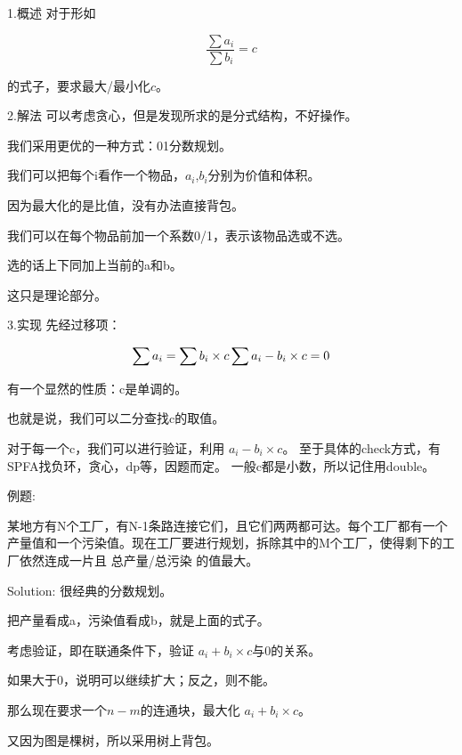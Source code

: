 1.概述
对于形如

$$
\frac{\sum a_i}{\sum b_i}=c
$$

的式子，要求最大/最小化$c$。

2.解法
可以考虑贪心，但是发现所求的是分式结构，不好操作。

我们采用更优的一种方式：01分数规划。

我们可以把每个i看作一个物品，$a_i$,$b_i$分别为价值和体积。

因为最大化的是比值，没有办法直接背包。

我们可以在每个物品前加一个系数0/1，表示该物品选或不选。

选的话上下同加上当前的a和b。

这只是理论部分。

3.实现
先经过移项：

$$
\sum a_i=\sum b_i\times c \\
\sum a_i-b_i\times c=0
$$

有一个显然的性质：c是单调的。

也就是说，我们可以二分查找c的取值。

对于每一个c，我们可以进行验证，利用 $a_i-b_i\times c$。
至于具体的check方式，有SPFA找负环，贪心，dp等，因题而定。
一般c都是小数，所以记住用double。

例题:

某地方有N个工厂，有N-1条路连接它们，且它们两两都可达。每个工厂都有一个产量值和一个污染值。现在工厂要进行规划，拆除其中的M个工厂，使得剩下的工厂依然连成一片且 总产量/总污染 的值最大。

Solution:
很经典的分数规划。

把产量看成a，污染值看成b，就是上面的式子。

考虑验证，即在联通条件下，验证 $a_i+b_i\times c$与0的关系。

如果大于0，说明可以继续扩大；反之，则不能。

那么现在要求一个$n-m$的连通块，最大化 $a_i+b_i\times c$。

又因为图是棵树，所以采用树上背包。